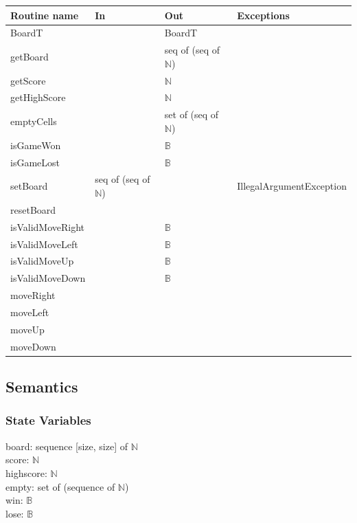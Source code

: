 \documentclass[12pt]{article}
\begin{document}
\begin{tabular}{| l | l | l | l |}
\hline
\textbf{Routine name} & \textbf{In} & \textbf{Out} & \textbf{Exceptions}\\
\hline
BoardT & ~ & BoardT & \\
\hline
getBoard & ~ & seq of (seq of $\mathbb{N}$) & \\
\hline
getScore & ~ & $\mathbb{N}$ & \\
\hline
getHighScore & ~ & $\mathbb{N}$ & \\
\hline
emptyCells & ~ & set of (seq of $\mathbb{N}$) & \\
\hline
isGameWon & ~ & $\mathbb{B}$ & \\
\hline
isGameLost & ~ & $\mathbb{B}$ & \\
\hline
setBoard & seq of (seq of $\mathbb{N}$) & ~ & IllegalArgumentException\\
\hline
resetBoard  & ~ &  ~     & \\
\hline
isValidMoveRight  & ~ &  $\mathbb{B}$   & \\
\hline
isValidMoveLeft  &  ~  &  $\mathbb{B}$   & \\
\hline
isValidMoveUp  &  ~  &  $\mathbb{B}$   & \\
\hline
isValidMoveDown  &  ~  & $\mathbb{B}$ & \\
\hline
moveRight  & ~  &  ~     & \\
\hline
moveLeft  &  ~ &  ~     & \\
\hline
moveUp  &  ~  &  ~     & \\
\hline
moveDown  &  ~  &  ~     & \\
\hline
\end{tabular}

\subsection* {Semantics}

\subsubsection* {State Variables}

board: sequence [size, size] of $\mathbb{N}$ \\
score: $\mathbb{N}$ \\
highscore: $\mathbb{N}$ \\
empty: set of (sequence of $\mathbb{N}$) \\
win: $\mathbb{B}$ \\
lose: $\mathbb{B}$
\end{document}
